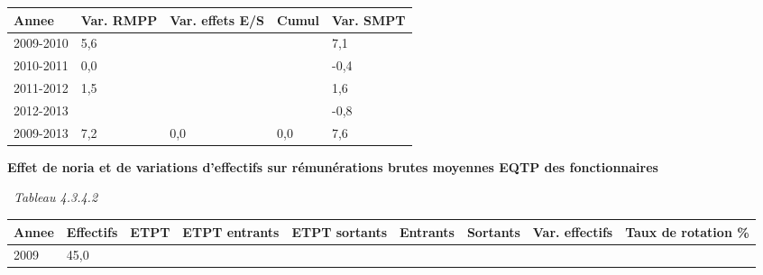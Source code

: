 \begin{longtable}[]{@{}lllll@{}}
\toprule
Annee & Var. RMPP & Var. effets E/S & Cumul & Var. SMPT\tabularnewline
\midrule
\endhead
2009-2010 & 5,6 & & & 7,1\tabularnewline
2010-2011 & 0,0 & & & -0,4\tabularnewline
2011-2012 & 1,5 & & & 1,6\tabularnewline
2012-2013 & & & & -0,8\tabularnewline
2009-2013 & 7,2 & 0,0 & 0,0 & 7,6\tabularnewline
\bottomrule
\end{longtable}

\textbf{Effet de noria et de variations d'effectifs sur rémunérations
brutes moyennes EQTP des fonctionnaires}

~\emph{Tableau 4.3.4.2}

\begin{longtable}[]{@{}lllllllll@{}}
\toprule
\begin{minipage}[b]{0.05\columnwidth}\raggedright
Annee\strut
\end{minipage} & \begin{minipage}[b]{0.08\columnwidth}\raggedright
Effectifs\strut
\end{minipage} & \begin{minipage}[b]{0.04\columnwidth}\raggedright
ETPT\strut
\end{minipage} & \begin{minipage}[b]{0.10\columnwidth}\raggedright
ETPT entrants\strut
\end{minipage} & \begin{minipage}[b]{0.10\columnwidth}\raggedright
ETPT sortants\strut
\end{minipage} & \begin{minipage}[b]{0.07\columnwidth}\raggedright
Entrants\strut
\end{minipage} & \begin{minipage}[b]{0.07\columnwidth}\raggedright
Sortants\strut
\end{minipage} & \begin{minipage}[b]{0.11\columnwidth}\raggedright
Var. effectifs\strut
\end{minipage} & \begin{minipage}[b]{0.14\columnwidth}\raggedright
Taux de rotation \%\strut
\end{minipage}\tabularnewline
\midrule
\endhead
\begin{minipage}[t]{0.05\columnwidth}\raggedright
2009\strut
\end{minipage} & \begin{minipage}[t]{0.08\columnwidth}\raggedright
45,0\strut
\end{minipage} & \begin{minipage}[t]{0.04\columnwidth}\raggedright

\end{minipage}
\end{longtable}
